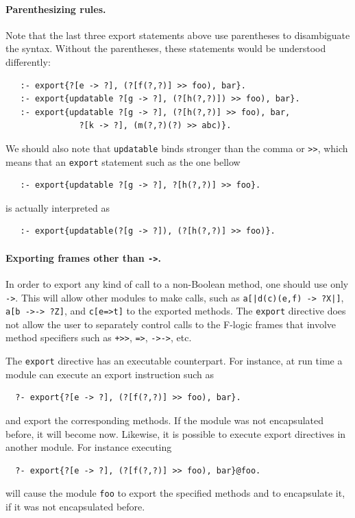 \documentclass[11pt]{article}
\begin{document}
\paragraph{Parenthesizing rules.}
Note that the last three export statements above use parentheses to
disambiguate the syntax. Without the parentheses, these statements would be
understood differently:
\begin{verbatim}
   :- export{?[e -> ?], (?[f(?,?)] >> foo), bar}.
   :- export{updatable ?[g -> ?], (?[h(?,?)]) >> foo), bar}.
   :- export{updatable ?[g -> ?], (?[h(?,?)] >> foo), bar,
               ?[k -> ?], (m(?,?)(?) >> abc)}.  
\end{verbatim}
We should also note that {\tt updatable} binds stronger than the comma or
{\tt >{}>}, which means that an {\tt export} statement such as the one bellow
\begin{verbatim}
   :- export{updatable ?[g -> ?], ?[h(?,?)] >> foo}.
\end{verbatim}
is actually interpreted as
\begin{verbatim}
   :- export{updatable(?[g -> ?]), (?[h(?,?)] >> foo)}.
\end{verbatim}

\paragraph{Exporting frames other than {\tt ->}.}  
In order to export any kind of call to a non-Boolean
method, one should use only {\tt ->}. This will
allow other modules to make calls, such as {\tt a[|d(c)(e,f) -> ?X|]}, {\tt
  a[b ->-> ?Z]}, and {\tt c[e=>t]}  to the exported methods.  The {\tt export}
directive does not allow the user to separately control calls to the
F-logic frames that involve method specifiers such as {\tt +>{}>}, {\tt =>},
{\tt ->->}, etc.

The {\tt export} directive has an executable counterpart. For instance, at
run time a module can execute an export instruction such as 
\begin{verbatim}
  ?- export{?[e -> ?], (?[f(?,?)] >> foo), bar}.
\end{verbatim}
and export the corresponding methods. If the module was not encapsulated
before, it will become now. Likewise, it is possible to execute export
directives in another module. For instance executing
\begin{verbatim}
  ?- export{?[e -> ?], (?[f(?,?)] >> foo), bar}@foo.
\end{verbatim}
will cause the module {\tt foo} to export the specified methods and to
encapsulate it, if it was not encapsulated before. 
\end{document}
